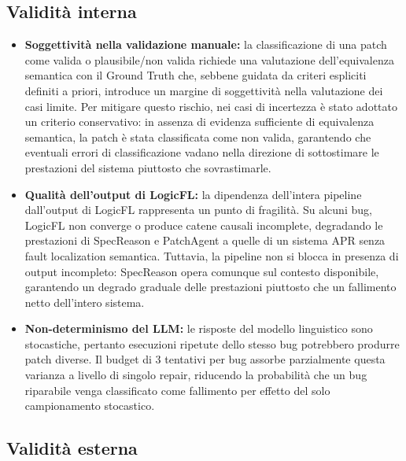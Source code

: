 \subsection{Validità interna}
\begin {itemize}
        \item \textbf{Soggettività nella validazione manuale:} la classificazione di una patch come valida
         o plausibile/non valida richiede una valutazione dell'equivalenza semantica con il Ground Truth
         che, sebbene guidata da criteri espliciti definiti a priori, introduce un margine di soggettività
         nella valutazione dei casi limite. Per mitigare questo rischio, nei casi di incertezza è stato
         adottato un criterio conservativo: in assenza di evidenza sufficiente di equivalenza semantica,
         la patch è stata classificata come non valida, garantendo che eventuali errori di classificazione
         vadano nella direzione di sottostimare le prestazioni del sistema piuttosto che sovrastimarle.
         \item \textbf{Qualità dell'output di LogicFL:} la dipendenza dell'intera pipeline dall'output di LogicFL
         rappresenta un punto di fragilità. Su alcuni bug, LogicFL non converge o produce catene causali
         incomplete, degradando le prestazioni di SpecReason e PatchAgent a quelle di un sistema APR senza
         fault localization semantica. Tuttavia, la pipeline non si blocca in presenza di output incompleto:
         SpecReason opera comunque sul contesto disponibile, garantendo un degrado graduale delle prestazioni
         piuttosto che un fallimento netto dell'intero sistema.
         \item \textbf{Non-determinismo del LLM:} le risposte del modello linguistico sono stocastiche, pertanto
         esecuzioni ripetute dello stesso bug potrebbero produrre patch diverse. Il budget di 3 tentativi per bug
         assorbe parzialmente questa varianza a livello di singolo repair, riducendo la probabilità che un bug
         riparabile venga classificato come fallimento per effetto del solo campionamento stocastico.
\end{itemize}

\subsection{Validità esterna}

